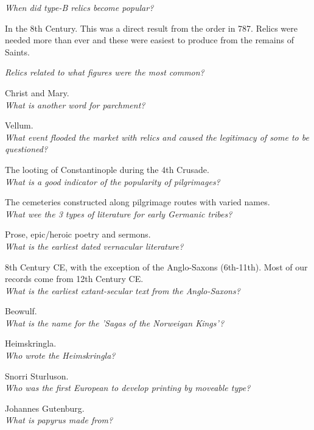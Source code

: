 \documentclass[12pt]{article}
\begin{document}
\textit{When did type-B relics become popular?}

In the 8th Century. This was a direct result from the order in 787. Relics were needed more than ever and these were easiest to produce from the remains of Saints.

\textit{Relics related to what figures were the most common?}

Christ and Mary.\\

\textit{What is another word for parchment?}

Vellum.\\

\textit{What event flooded the market with relics and caused the legitimacy of some to be questioned?}

The looting of Constantinople during the 4th Crusade.\\

\textit{What is a good indicator of the popularity of pilgrimages?}

The cemeteries constructed along pilgrimage routes with varied names.\\

\textit{What wee the 3 types of literature for early Germanic tribes?}

Prose, epic/heroic poetry and sermons.\\

\textit{What is the earliest dated vernacular literature?}

8th Century CE, with the exception of the Anglo-Saxons (6th-11th). Most of our records come from 12th Century CE.\\

\textit{What is the earliest extant-secular text from the Anglo-Saxons?}

Beowulf.\\

\textit{What is the name for the 'Sagas of the Norweigan Kings'?}

Heimskringla.\\

\textit{Who wrote the Heimskringla?}

Snorri Sturluson.\\

\textit{Who was the first European to develop printing by moveable type?}

Johannes Gutenburg.\\

\textit{What is papyrus made from?}
\end{document}
